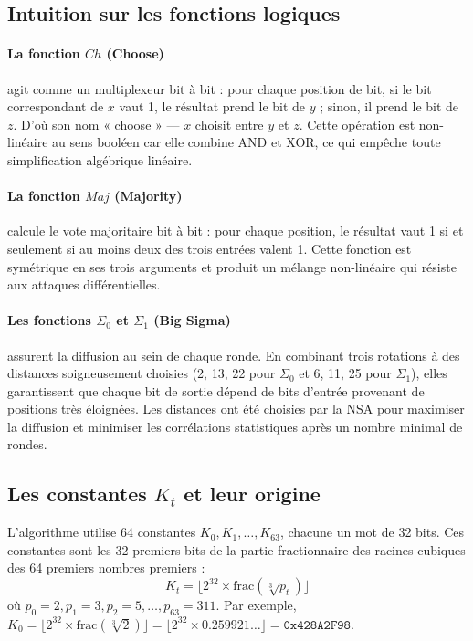 \subsection{Intuition sur les fonctions logiques}

\paragraph{La fonction $Ch$ (Choose)} agit comme un multiplexeur bit à bit : pour chaque position de bit, si le bit correspondant de $x$ vaut 1, le résultat prend le bit de $y$ ; sinon, il prend le bit de $z$. D'où son nom « choose » --- $x$ choisit entre $y$ et $z$. Cette opération est non-linéaire au sens booléen car elle combine AND et XOR, ce qui empêche toute simplification algébrique linéaire.

\paragraph{La fonction $Maj$ (Majority)} calcule le vote majoritaire bit à bit : pour chaque position, le résultat vaut 1 si et seulement si au moins deux des trois entrées valent 1. Cette fonction est symétrique en ses trois arguments et produit un mélange non-linéaire qui résiste aux attaques différentielles.

\paragraph{Les fonctions $\Sigma_0$ et $\Sigma_1$ (Big Sigma)} assurent la diffusion au sein de chaque ronde. En combinant trois rotations à des distances soigneusement choisies (2, 13, 22 pour $\Sigma_0$ et 6, 11, 25 pour $\Sigma_1$), elles garantissent que chaque bit de sortie dépend de bits d'entrée provenant de positions très éloignées. Les distances ont été choisies par la NSA pour maximiser la diffusion et minimiser les corrélations statistiques après un nombre minimal de rondes.

\subsection{Les constantes $K_t$ et leur origine}

L'algorithme utilise 64 constantes $K_0, K_1, \ldots, K_{63}$, chacune un mot de 32 bits. Ces constantes sont les 32 premiers bits de la partie fractionnaire des racines cubiques des 64 premiers nombres premiers :
\[
K_t = \lfloor 2^{32} \times \text{frac}(\sqrt[3]{p_t}) \rfloor
\]
où $p_0 = 2, p_1 = 3, p_2 = 5, \ldots, p_{63} = 311$. Par exemple, $K_0 = \lfloor 2^{32} \times \text{frac}(\sqrt[3]{2}) \rfloor = \lfloor 2^{32} \times 0.259921\ldots \rfloor = \texttt{0x428A2F98}$.

